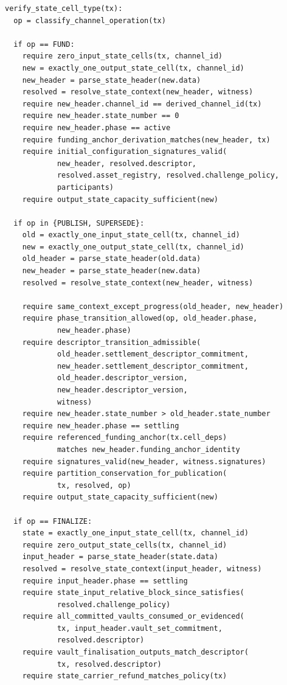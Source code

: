 \documentclass[a4paper,11pt]{article}
\begin{document}
\clearpage
\begin{lstlisting}
verify_state_cell_type(tx):
  op = classify_channel_operation(tx)

  if op == FUND:
    require zero_input_state_cells(tx, channel_id)
    new = exactly_one_output_state_cell(tx, channel_id)
    new_header = parse_state_header(new.data)
    resolved = resolve_state_context(new_header, witness)
    require new_header.channel_id == derived_channel_id(tx)
    require new_header.state_number == 0
    require new_header.phase == active
    require funding_anchor_derivation_matches(new_header, tx)
    require initial_configuration_signatures_valid(
            new_header, resolved.descriptor,
            resolved.asset_registry, resolved.challenge_policy,
            participants)
    require output_state_capacity_sufficient(new)

  if op in {PUBLISH, SUPERSEDE}:
    old = exactly_one_input_state_cell(tx, channel_id)
    new = exactly_one_output_state_cell(tx, channel_id)
    old_header = parse_state_header(old.data)
    new_header = parse_state_header(new.data)
    resolved = resolve_state_context(new_header, witness)

    require same_context_except_progress(old_header, new_header)
    require phase_transition_allowed(op, old_header.phase,
            new_header.phase)
    require descriptor_transition_admissible(
            old_header.settlement_descriptor_commitment,
            new_header.settlement_descriptor_commitment,
            old_header.descriptor_version,
            new_header.descriptor_version,
            witness)
    require new_header.state_number > old_header.state_number
    require new_header.phase == settling
    require referenced_funding_anchor(tx.cell_deps)
            matches new_header.funding_anchor_identity
    require signatures_valid(new_header, witness.signatures)
    require partition_conservation_for_publication(
            tx, resolved, op)
    require output_state_capacity_sufficient(new)

  if op == FINALIZE:
    state = exactly_one_input_state_cell(tx, channel_id)
    require zero_output_state_cells(tx, channel_id)
    input_header = parse_state_header(state.data)
    resolved = resolve_state_context(input_header, witness)
    require input_header.phase == settling
    require state_input_relative_block_since_satisfies(
            resolved.challenge_policy)
    require all_committed_vaults_consumed_or_evidenced(
            tx, input_header.vault_set_commitment,
            resolved.descriptor)
    require vault_finalisation_outputs_match_descriptor(
            tx, resolved.descriptor)
    require state_carrier_refund_matches_policy(tx)


\end{lstlisting}
\end{document}
